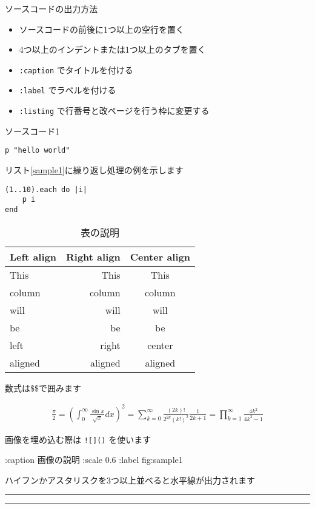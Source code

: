 \documentclass[a4j]{jarticle}
\begin{document}
ソースコードの出力方法

\begin{itemize}
\item ソースコードの前後に1つ以上の空行を置く
\item 4つ以上のインデントまたは1つ以上のタブを置く
\item {\tt :caption} でタイトルを付ける
\item {\tt :label} でラベルを付ける
\item {\tt :listing} で行番号と改ページを行う枠に変更する
\end{itemize}

\begin{itembox}[c]{ソースコード1}\begin{verbatim}
p "hello world"
\end{verbatim}\end{itembox}

リスト\ref{sample1}に繰り返し処理の例を示します

\begin{lstlisting}[caption=繰り返しの例 ,label=sample1]
(1..10).each do |i|
	p i
end
\end{lstlisting}

\begin{table}[h]
\centering
\caption{表の説明 }
\label{table:1}
\begin{tabular}{|l|r|c|}
\hline
Left align & Right align & Center align\\
\hline
This & This & This\\
column & column & column\\
will & will & will\\
be & be & be\\
left & right & center\\
aligned & aligned & aligned\\
\hline
\end{tabular}
\end{table}

数式は\$\$で囲みます

\begin{eqnarray*}
\frac{\pi}{2}
= \left( \int_{0}^{\infty} \frac{\sin x}{\sqrt{x}} dx \right)^2 
= \sum_{k=0}^{\infty} \frac{(2k)!}{2^{2k}(k!)^2} \frac{1}{2k+1} 
= \prod_{k=1}^{\infty} \frac{4k^2}{4k^2 - 1}
\end{eqnarray*}

画像を埋め込む際は {\tt ![]()} を使います


 :caption 画像の説明 :scale 0.6 :label fig:sample1 \fi

ハイフンかアスタリスクを3つ以上並べると水平線が出力されます

\begin{center}
\rule{3in}{0.4pt}
\end{center}

\begin{center}
\rule{3in}{0.4pt}
\end{center}
\end{document}
